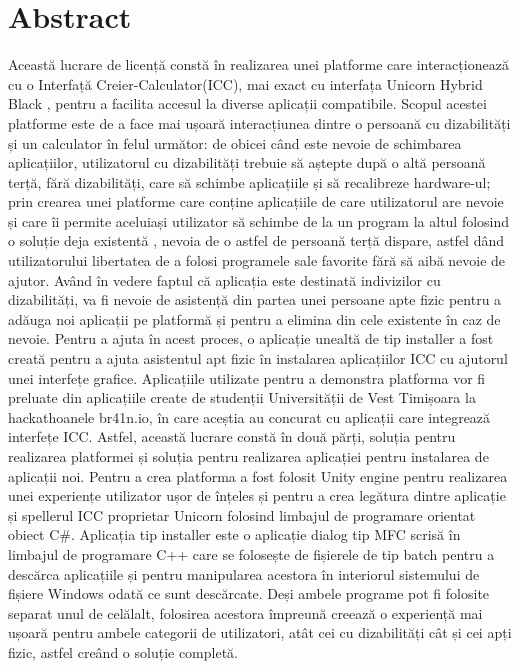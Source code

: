 
\chapter*{Abstract}\label{cap:abstract_ro}
Această lucrare de licență constă în realizarea unei platforme care interacționează cu o Interfață Creier-Calculator(ICC), mai exact cu interfața Unicorn Hybrid Black \cite{Unicorn_Technology}, pentru a facilita accesul la diverse aplicații compatibile. Scopul acestei platforme este de a face mai ușoară interacțiunea dintre o persoană cu dizabilități și un calculator în felul următor: de obicei când este nevoie de schimbarea aplicațiilor, utilizatorul cu dizabilități trebuie să aștepte după o altă persoană terță, fără dizabilități, care să schimbe aplicațiile și să recalibreze hardware-ul; prin crearea unei platforme care conține aplicațiile de care utilizatorul are nevoie și care îi permite aceluiași utilizator să schimbe de la un program la altul folosind o soluție deja existentă \cite{Unicorn_Speller}, nevoia de o astfel de persoană terță dispare, astfel dând utilizatorului libertatea de a folosi programele sale favorite fără să aibă nevoie de ajutor.
\vspace{\baselineskip}\newline
Având în vedere faptul că aplicația este destinată indivizilor cu dizabilități, va fi nevoie de asistență din partea unei persoane apte fizic pentru a adăuga noi aplicații pe platformă și pentru a elimina din cele existente în caz de nevoie. Pentru a ajuta în acest proces, o aplicație unealtă de tip installer a fost creată pentru a ajuta asistentul apt fizic în instalarea aplicațiilor ICC cu ajutorul unei interfețe grafice. Aplicațiile utilizate pentru a demonstra platforma vor fi preluate din aplicațiile create de studenții Universității de Vest Timișoara la hackathoanele br41n.io, în care aceștia au concurat cu aplicații care integrează interfețe ICC.
\vspace{\baselineskip}\newline
Astfel, această lucrare constă în două părți, soluția pentru realizarea platformei și soluția pentru realizarea aplicației pentru instalarea de aplicații noi. Pentru a crea platforma a fost folosit Unity engine pentru realizarea unei experiențe utilizator ușor de înțeles și pentru a crea legătura dintre aplicație și spellerul ICC proprietar Unicorn \cite{Unicorn_Speller} folosind limbajul de programare orientat obiect C\#. Aplicația tip installer este o aplicație dialog tip MFC scrisă în limbajul de programare C++ care se folosește de fișierele de tip batch pentru a descărca aplicațiile și pentru manipularea acestora în interiorul sistemului de fișiere Windows odată ce sunt descărcate. Deși ambele programe pot fi folosite separat unul de celălalt, folosirea acestora împreună creează o experiență mai ușoară pentru ambele categorii de utilizatori, atât cei cu dizabilități cât și cei apți fizic, astfel creând o soluție completă.


